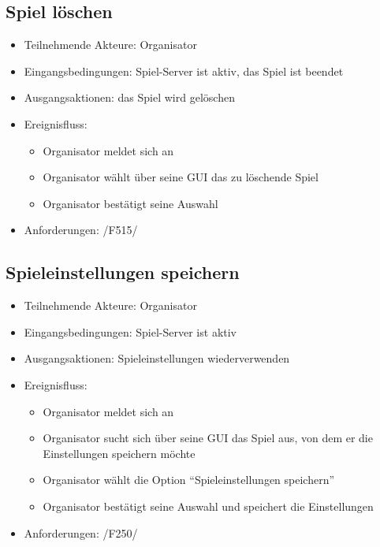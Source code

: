 \documentclass[a4paper]{scrreprt}
\begin{document}
    \subsection{Spiel löschen}
    \begin{itemize}
        \item Teilnehmende Akteure: \Gls{Organisator}
        \item Eingangsbedingungen: Spiel-Server ist aktiv, das Spiel ist beendet
        \item Ausgangsaktionen: das Spiel wird gelöschen
        \item Ereignisfluss:
        \begin{itemize}
            \item \Gls{Organisator} meldet sich an
            \item \Gls{Organisator} wählt über seine GUI das zu löschende Spiel
            \item \Gls{Organisator} bestätigt seine Auswahl
        \end{itemize}
        \item Anforderungen: /F515/
    \end{itemize}

    \subsection{Spieleinstellungen speichern}
    \begin{itemize}
        \item Teilnehmende Akteure: \Gls{Organisator}
        \item Eingangsbedingungen: Spiel-Server ist aktiv
        \item Ausgangsaktionen: \Gls{Spieleinstellungen} wiederverwenden
        \item Ereignisfluss:
        \begin{itemize}
            \item \Gls{Organisator} meldet sich an
            \item \Gls{Organisator} sucht sich über seine GUI das Spiel aus, von dem er die Einstellungen speichern möchte
            \item \Gls{Organisator} wählt die Option \enquote{Spieleinstellungen speichern}
            \item \Gls{Organisator} bestätigt seine Auswahl und speichert die Einstellungen
        \end{itemize}
        \item Anforderungen: /F250/
    \end{itemize}
\end{document}
